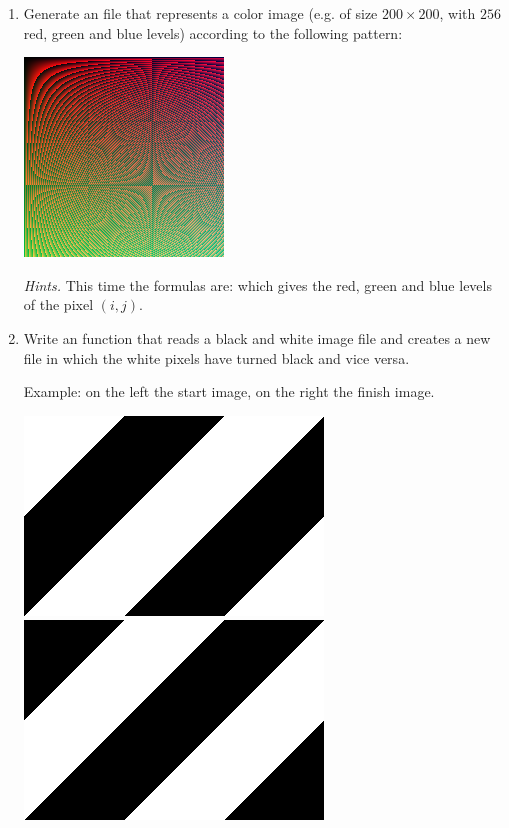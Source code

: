 \documentclass[11pt,class=report,crop=false]{standalone}
\begin{document}
\begin{activite}
\begin{enumerate}
   \item Generate an  file that represents a color image (e.g. of size $200 \times 200$, with $256$ red, green and blue levels) according to the following pattern:
\begin{center}
\includegraphics[scale=\myscale,scale=0.7]{screen-image_coul}
\end{center}   

\emph{Hints.} This time the formulas are:
which gives the red, green and blue levels of the pixel $(i,j)$.

\item Write an  function that reads a black and white image  file and creates a new file in which the white pixels have turned black and vice versa. 

Example: on the left the start image, on the right the finish image.
\begin{center}
\includegraphics[scale=\myscale,scale=0.3]{screen-simple_nb}\qquad\qquad
\includegraphics[scale=\myscale,scale=0.3]{screen-simple_nb_inverse}
\end{center} 


\end{enumerate}
\end{activite}
\end{document}
